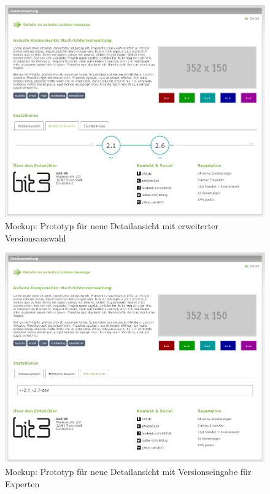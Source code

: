 \documentclass[
paper=a4,
draft=false,%
fontsize=10pt%
]{scrartcl}
\begin{document}
\begin{figure}[p]
  \centering
  \includegraphics[width=\textwidth]{bilder/mockup-details-2}
  \caption{Mockup: Prototyp für neue Detailansicht mit erweiterter Versionsauswahl}
\end{figure}

\begin{figure}[p]
  \centering
  \includegraphics[width=\textwidth]{bilder/mockup-details-3}
  \caption{Mockup: Prototyp für neue Detailansicht mit Versionseingabe für Experten}
\end{figure}
\end{document}
